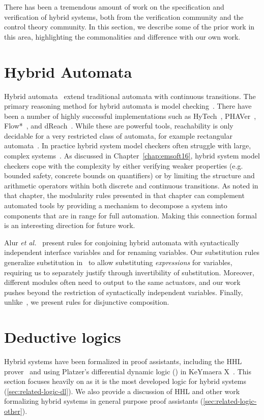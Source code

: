 There has been a tremendous amount of work on the specification and
verification of hybrid systems, both from the verification community and
the control theory community.  In this section, we describe some of the
prior work in this area, highlighting the commonalities and difference with
our own work.

\section{Hybrid Automata}
Hybrid automata~\cite{Henzinger96theoryhybrid,Lynch03IO} extend traditional
automata with continuous transitions.  The primary reasoning method for
hybrid automata is model checking~\cite{PHAVerSTTT08,HyTechCAV97}.  There
have been a number of highly successful implementations such as
\textsf{HyTech}~\cite{HyTechCAV97}, \textsf{PHAVer}~\cite{PHAVerSTTT08},
Flow*~\cite{chen2015flow}, and dReach~\cite{kong2015dreach}. While these
are powerful tools, reachability is only decidable for a very restricted
class of automata, for example rectangular automata~\cite{HenzingerKPV98}.
In practice hybrid system model checkers often struggle with large, complex
systems~\cite{muller2000modelling}. As discussed in
Chapter~\ref{chap:emsoft16}, hybrid system model checkers cope with the
complexity by either verifying weaker properties (e.g. bounded safety,
concrete bounds on quantifiers) or by limiting the structure and arithmetic
operators within both discrete and continuous transitions. As noted in that
chapter, the modularity rules presented in that chapter can complement
automated tools by providing a mechanism to decompose a system into
components that are in range for full automation. Making this connection
formal is an interesting direction for future work.

Alur \emph{et al.}~\cite{alur1997modularity} present rules for conjoining
hybrid automata with syntactically independent interface variables and for
renaming variables. Our substitution rules generalize substitution
in~\cite{alur1997modularity} to allow substituting \emph{expressions} for
variables, requiring us to separately justify \progress{} through
invertibility of substitution.  Moreover, different modules often need to
output to the same actuators, and our work pushes beyond the restriction of
syntactically independent variables.  Finally,
unlike~\cite{alur1997modularity}, we present rules for disjunctive
composition.

\section{Deductive logics}
Hybrid systems have been formalized in proof assistants, including the HHL
prover~\cite{LiuHHL10,WangHHL2015} and using Platzer's differential dynamic
logic (\dL{}) in KeYmaera X~\cite{KeYmaeraX}. This section focuses heavily
on \dL{} as it is the most developed logic for hybrid systems
(\ref{sec:related-logic-dl}). We also provide a discussion of HHL and other
work formalizing hybrid systems in general purpose proof assistants
(\ref{sec:related-logic-other}).

